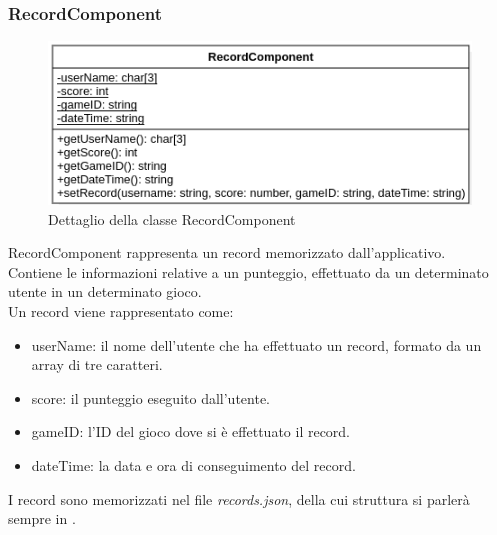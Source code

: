 \subsubsection{RecordComponent}
\label{subsec:recordComponent}
\begin{figure}[h]
    \centering
    \includegraphics[width=340pt]{images/prog/Record.png}
    \caption{Dettaglio della classe RecordComponent}
    \label{fig:recordComponent}
\end{figure}
RecordComponent rappresenta un record memorizzato dall'applicativo.\\ Contiene le informazioni relative a un punteggio, effettuato da un determinato utente in un determinato gioco.\\
Un record viene rappresentato come:
\begin{itemize}
    \item userName: il nome dell'utente che ha effettuato un record, formato da un array di tre caratteri.
    \item score: il punteggio eseguito dall'utente.
    \item gameID: l'ID del gioco dove si è effettuato il record.
    \item dateTime: la data e ora di conseguimento del record.
\end{itemize}
I record sono memorizzati nel file \emph{records.json}, della cui struttura si parlerà sempre in .

